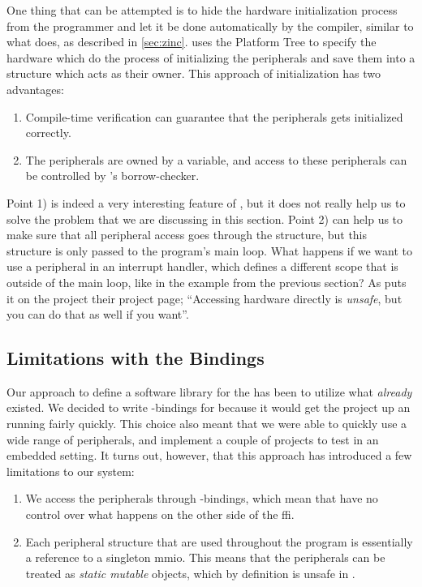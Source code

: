 One thing that can be attempted is to hide the hardware initialization process from the programmer and let it be done automatically by the compiler, similar to what {\zinc} does, as described in \autoref{sec:zinc}.
{\zinc} uses the Platform Tree to specify the hardware which do the process of initializing the peripherals and save them into a  structure which acts as their owner.
This approach of initialization has two advantages:

\begin{enumerate}[\hspace{13}1)]
    \item Compile-time verification can guarantee that the peripherals gets initialized correctly.
    \item The peripherals are owned by a variable, and access to these peripherals can be controlled by {\rust}'s borrow-checker.
\end{enumerate}

Point 1) is indeed a very interesting feature of {\zinc}, but it does not really help us to solve the problem that we are discussing in this section.
Point 2) can help us to make sure that all peripheral access goes through the  structure, but this structure is only passed to the program's main loop.
What happens if we want to use a peripheral in an interrupt handler, which defines a different scope that is outside of the main loop, like in the example from the previous section?
As {\zinc} puts it on the project their project page; ``Accessing hardware directly is \emph{unsafe}, but you can do that as well if you want''.

\subsection{Limitations with the Bindings}

Our approach to define a software library for the {\gecko} has been to utilize what \emph{already} existed.
We decided to write {\rust}-bindings for {\emlib} because it would get the project up an running fairly quickly.
This choice also meant that we were able to quickly use a wide range of peripherals, and implement a couple of projects to test {\rust} in an embedded setting.
It turns out, however, that this approach has introduced a few limitations to our system:

\begin{enumerate}[\hspace{13}1)]
    \item We access the peripherals through {\C}-bindings, which mean that {\rust} have no control over what happens on the other side of the \gls{ffi}.

    \item Each peripheral structure that are used throughout the program is essentially a reference to a singleton \gls{mmio}.
    This means that the peripherals can be treated as \emph{static mutable} objects, which by definition is unsafe in {\rust}.

\end{enumerate}

